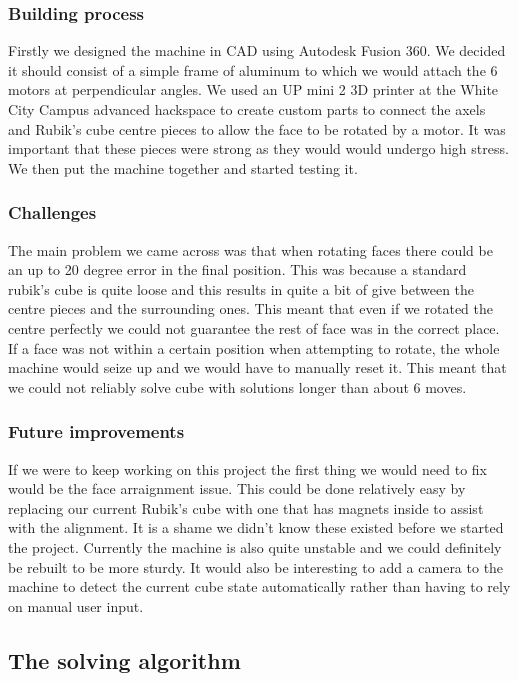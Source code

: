 \documentclass[8pt]{article}
\begin{document}
\subsubsection{Building process}

Firstly we designed the machine in CAD using Autodesk Fusion 360. We decided it should 
consist of a simple frame of aluminum to which we would attach the 6 motors at perpendicular 
angles. We used an UP mini 2 3D printer at the White City Campus advanced hackspace to create 
custom parts to connect the axels and Rubik's cube centre pieces to allow the face to be rotated 
by a motor. It was important that these pieces were strong as they would would undergo 
high stress. We then put the machine together and started testing it.

\subsubsection{Challenges}

The main problem we came across was that when rotating faces there could be an 
up to 20 degree error in the final position. This was because a standard rubik's
 cube is quite loose and this results in quite a bit of give between the centre 
 pieces and the surrounding ones. This meant that even if we rotated the centre 
 perfectly we could not guarantee the rest of face was in the correct place. If 
 a face was not within a certain position when attempting to rotate, the whole 
 machine would seize up and we would have to manually reset it. This meant that
  we could not reliably solve cube with solutions longer than about 6 moves.


\subsubsection{Future improvements}

If we were to keep working on this project the first thing we would need to fix 
would be the face arraignment issue. This could be done relatively easy by replacing
our current Rubik's cube with one that has magnets inside to assist with the alignment.
It is a shame we didn't know these existed before we started the project. Currently 
the machine is also quite unstable and we could definitely be rebuilt to be more sturdy. 
It would also be interesting to add a camera to the machine to detect the current cube state
automatically rather than having to rely on manual user input.


\subsection{The solving algorithm}
\end{document}

